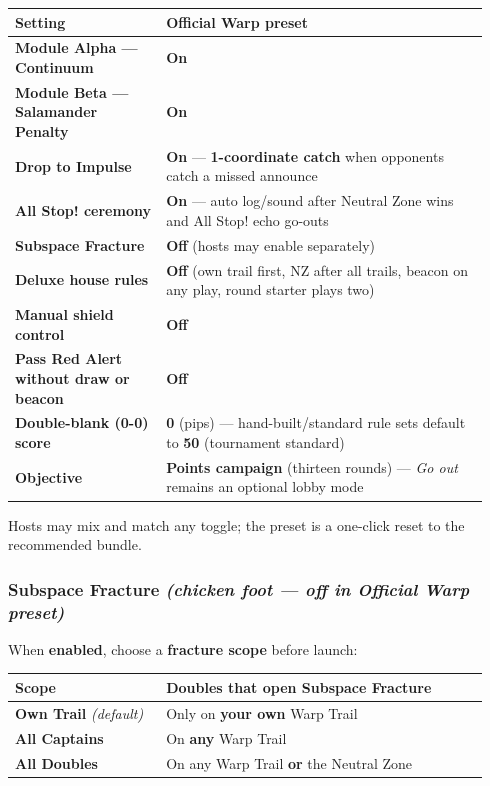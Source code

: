 \documentclass[11pt]{article}
\begin{document}
\begin{longtable}[]{@{}>{\raggedright\arraybackslash}p{0.30\linewidth}>{\raggedright\arraybackslash}p{0.64\linewidth}@{}}
\toprule\noalign{}
Setting & Official Warp preset \\
\midrule\noalign{}
\endhead
\bottomrule\noalign{}
\endlastfoot
\textbf{Module Alpha --- Continuum} & \textbf{On} \\
\textbf{Module Beta --- Salamander Penalty} & \textbf{On} \\
\textbf{Drop to Impulse} & \textbf{On} --- \textbf{1-coordinate catch} when
opponents catch a missed announce \\
\textbf{All Stop! ceremony} & \textbf{On} --- auto log/sound after
Neutral Zone wins and All Stop! echo go-outs \\
\textbf{Subspace Fracture} & \textbf{Off} (hosts may enable
separately) \\
\textbf{Deluxe house rules} & \textbf{Off} (own trail first, NZ after
all trails, beacon on any play, round starter plays two) \\
\textbf{Manual shield control} & \textbf{Off} \\
\textbf{Pass Red Alert without draw or beacon} & \textbf{Off} \\
\textbf{Double-blank (0-0) score} & \textbf{0} (pips) ---
hand-built/standard rule sets default to \textbf{50} (tournament
standard) \\
\textbf{Objective} & \textbf{Points campaign} (thirteen rounds) ---
\emph{Go out} remains an optional lobby mode \\
\end{longtable}

Hosts may mix and match any toggle; the preset is a one-click reset to
the recommended bundle.

\subsubsection{\texorpdfstring{Subspace Fracture \emph{(chicken foot ---
off in Official Warp
preset)}}{Subspace Fracture (chicken foot --- off in Official Warp preset)}}\label{subspace-fracture-chicken-foot--off-in-official-warp-preset}

When \textbf{enabled}, choose a \textbf{fracture scope} before launch:

\begin{longtable}[]{@{}>{\raggedright\arraybackslash}p{0.30\linewidth}>{\raggedright\arraybackslash}p{0.64\linewidth}@{}}
\toprule\noalign{}
Scope & Doubles that open Subspace Fracture \\
\midrule\noalign{}
\endhead
\bottomrule\noalign{}
\endlastfoot
\textbf{Own Trail} \emph{(default)} & Only on \textbf{your own} Warp
Trail \\
\textbf{All Captains} & On \textbf{any} Warp Trail \\
\textbf{All Doubles} & On any Warp Trail \textbf{or} the Neutral Zone \\
\end{longtable}
\end{document}
